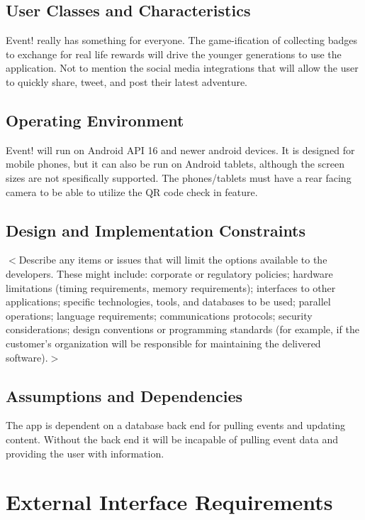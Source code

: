 \documentclass{scrreprt}
\begin{document}
\section{User Classes and Characteristics}
Event! really has something for everyone. The game-ification of collecting badges to
exchange for real life rewards will drive the younger generations to use the application.
Not to mention the social media integrations that will allow the user to quickly share, tweet, and 
post their latest adventure.

\section{Operating Environment}
Event! will run on Android API 16 and newer android devices. It is designed for 
mobile phones, but it can also be run on Android tablets, although the screen 
sizes are not spesifically supported. The phones/tablets must have a rear facing 
camera to be able to utilize the QR code check in feature.

\section{Design and Implementation Constraints}

$<$Describe any items or issues that will limit the options available to the 
developers. These might include: corporate or regulatory policies; hardware 
limitations (timing requirements, memory requirements); interfaces to other 
applications; specific technologies, tools, and databases to be used; parallel 
operations; language requirements; communications protocols; security 
considerations; design conventions or programming standards (for example, if the 
customer’s organization will be responsible for maintaining the delivered 
software).$>$

\section{Assumptions and Dependencies}
The app is dependent on a database back end for pulling events and updating 
content. Without the back end it will be incapable of pulling event data and 
providing the user with information.


\chapter{External Interface Requirements}
\end{document}
